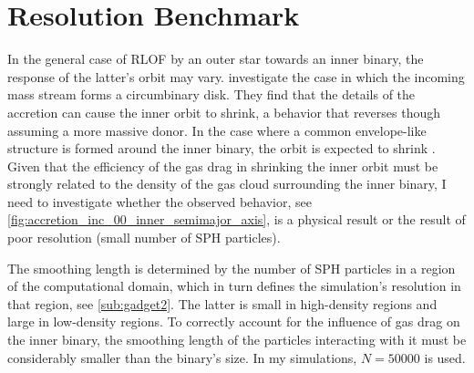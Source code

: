 \section{Resolution Benchmark}\label{sec:resolution}

In the general case of RLOF by an outer star towards an inner binary, the response of the latter's orbit may vary. \cite{zwart2019triple} investigate the case in which the incoming mass stream forms a circumbinary disk. They find that the details of the accretion can cause the inner orbit to shrink, a behavior that reverses though assuming a more massive donor. In the case where a common envelope-like structure is formed around the inner binary, the orbit is expected to shrink \citep{de2014evolution}. Given that the efficiency of the gas drag in shrinking the inner orbit must be strongly related to the density of the gas cloud surrounding the inner binary, I need to investigate whether the observed behavior, see \cref{fig:accretion_inc_00_inner_semimajor_axis}, is a physical result or the result of poor resolution (small number of SPH particles).

The smoothing length is determined by the number of SPH particles in a region of the computational domain, which in turn defines the simulation's resolution in that region, see \cref{sub:gadget2}. The latter is small in high-density regions and large in low-density regions. To correctly account for the influence of gas drag on the inner binary, the smoothing length of the particles interacting with it must be considerably smaller than the binary's size. In my simulations, $N=50000$ is used. 

